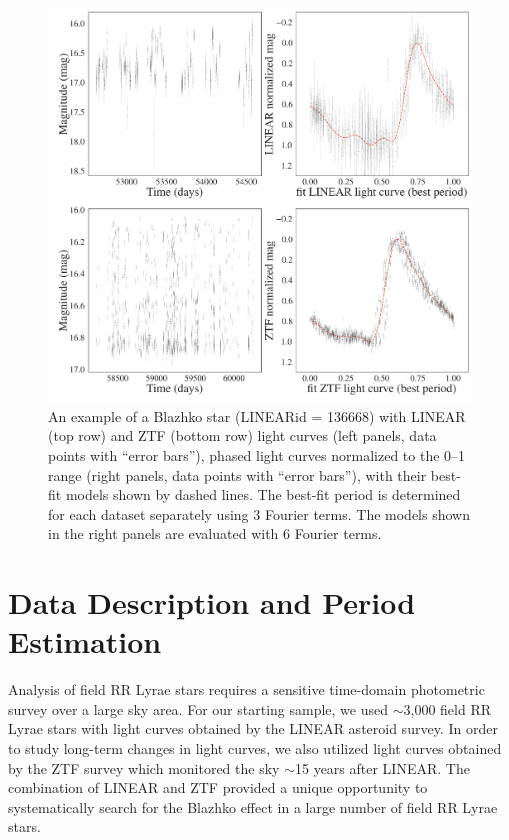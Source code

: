 
\phantom{There is some latex bug somewhere and this dummy call is needed to force it to make pdf...}



\begin{figure}[ht]
  \centering
  \includegraphics[width=18cm]{lc_pair.png}
  \vskip -0.2in
  \caption{An example of a Blazhko star (LINEARid = 136668) with LINEAR (top row) and ZTF (bottom row) light
    curves (left panels, data points with ``error bars''), phased light curves normalized to the 0--1 range (right panels, data points
    with ``error bars''), with their best-fit models shown by dashed lines. The best-fit period is determined for each
    dataset separately using 3 Fourier terms. The models shown in the right panels are evaluated with 6 Fourier terms. }
 \label{fig:lc_pair}
\end{figure}


\section{Data Description and Period Estimation \label{sec:data}}

Analysis of field RR Lyrae stars requires a sensitive time-domain photometric survey over a large sky area.
For our starting sample, we used $\sim$3,000 field RR Lyrae stars with light curves obtained by the LINEAR
asteroid survey. In order to study long-term changes in light curves, we also utilized light curves obtained
by the ZTF survey which monitored the sky $\sim$15 years after LINEAR. The combination of LINEAR and
ZTF provided a unique opportunity to systematically search for the Blazhko effect in a large number of
field RR Lyrae stars.


